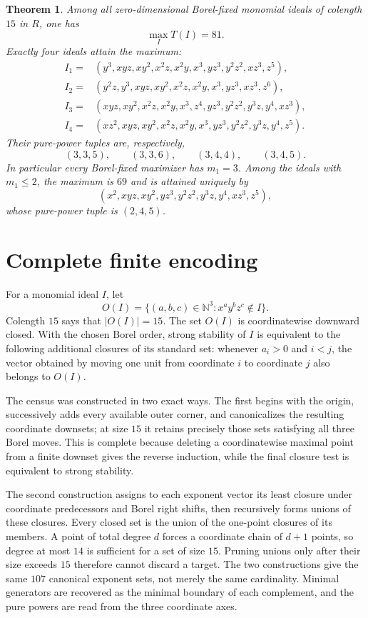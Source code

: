 \documentclass[11pt]{article}
\newtheorem{theorem}{Theorem}
\newcommand{\NN}{\mathbb N}
\begin{document}
\begin{theorem}\label{thm:main}
Among all zero-dimensional Borel-fixed monomial ideals of colength $15$ in
$R$, one has
\[
 \max_I T(I)=81.
\]
Exactly four ideals attain the maximum:
\begin{align*}
I_1={}&(y^3,xyz,xy^2,x^2z,x^2y,x^3,yz^3,y^2z^2,xz^3,z^5),\\
I_2={}&(y^2z,y^3,xyz,xy^2,x^2z,x^2y,x^3,yz^3,xz^3,z^6),\\
I_3={}&(xyz,xy^2,x^2z,x^2y,x^3,z^4,yz^3,y^2z^2,y^3z,y^4,xz^3),\\
I_4={}&(xz^2,xyz,xy^2,x^2z,x^2y,x^3,yz^3,y^2z^2,y^3z,y^4,z^5).
\end{align*}
Their pure-power tuples are, respectively,
\[
 (3,3,5),\qquad(3,3,6),\qquad(3,4,4),\qquad(3,4,5).
\]
In particular every Borel-fixed maximizer has $m_1=3$.  Among the ideals
with $m_1\leq2$, the maximum is $69$ and is attained uniquely by
\[
 (x^2,xyz,xy^2,yz^3,y^2z^2,y^3z,y^4,xz^3,z^5),
\]
whose pure-power tuple is $(2,4,5)$.
\end{theorem}

\section{Complete finite encoding}

For a monomial ideal $I$, let
\[
 O(I)=\{(a,b,c)\in\NN^3:x^ay^bz^c\notin I\}.
\]
Colength $15$ says that $|O(I)|=15$.  The set $O(I)$ is coordinatewise
downward closed.  With the chosen Borel order, strong stability of $I$ is
equivalent to the following additional closures of its standard set:
whenever $a_i>0$ and $i<j$, the vector obtained by moving one unit from
coordinate $i$ to coordinate $j$ also belongs to $O(I)$.

The census was constructed in two exact ways.  The first begins with the
origin, successively adds every available outer corner, and canonicalizes
the resulting coordinate downsets; at size $15$ it retains precisely those
sets satisfying all three Borel moves.  This is complete because deleting a
coordinatewise maximal point from a finite downset gives the reverse
induction, while the final closure test is equivalent to strong stability.

The second construction assigns to each exponent vector its least closure
under coordinate predecessors and Borel right shifts, then recursively forms
unions of these closures.  Every closed set is the union of the one-point
closures of its members.  A point of total degree $d$ forces a coordinate
chain of $d+1$ points, so degree at most $14$ is sufficient for a set of
size $15$.  Pruning unions only after their size exceeds $15$ therefore
cannot discard a target.  The two constructions give the same $107$
canonical exponent sets, not merely the same cardinality.  Minimal
generators are recovered as the minimal boundary of each complement, and
the pure powers are read from the three coordinate axes.
\end{document}
